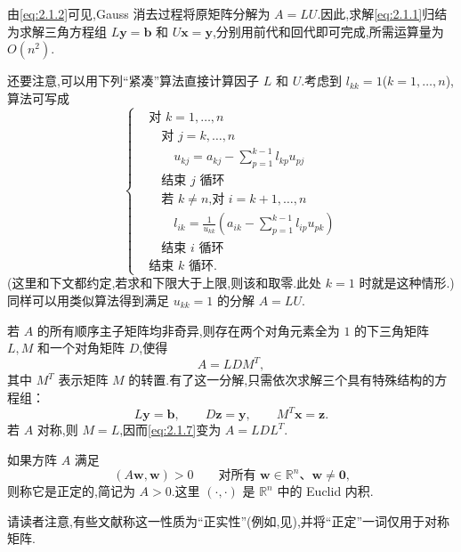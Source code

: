 由\eqref{eq:2.1.2}可见,Gauss 消去过程将原矩阵分解为 \(A=LU\).因此,求解\eqref{eq:2.1.1}归结为求解三角方程组 \(L\boldsymbol{y}=\boldsymbol{b}\) 和 \(U\boldsymbol{x}=\boldsymbol{y}\),分别用前代和回代即可完成,所需运算量为 \(O(n^2)\).

还要注意,可以用下列“紧凑”算法直接计算因子 \(L\) 和 \(U\).考虑到 \(l_{kk}=1\)(\(k=1,\ldots,n\)),算法可写成
\begin{equation}\label{eq:2.1.6}
  \left\{
  \begin{aligned}
    &\text{对 }k=1,\ldots,n\\
    &\quad\text{对 }j=k,\ldots,n\\
    &\qquad u_{kj}=a_{kj}-\sum_{p=1}^{k-1} l_{kp}u_{pj}\\
    &\quad\text{结束 \(j\) 循环}\\
    &\quad\text{若 \(k\ne n\),对 }i=k+1,\ldots,n\\
    &\qquad l_{ik}=\frac1{u_{kk}}\left(a_{ik}-\sum_{p=1}^{k-1} l_{ip}u_{pk}\right)\\
    &\quad\text{结束 \(i\) 循环}\\
    &\text{结束 \(k\) 循环.}
  \end{aligned}
  \right.
\end{equation}
(这里和下文都约定,若求和下限大于上限,则该和取零.此处 \(k=1\) 时就是这种情形.)同样可以用类似算法得到满足 \(u_{kk}=1\) 的分解 \(A=LU\).

若 \(A\) 的所有顺序主子矩阵均非奇异,则存在两个对角元素全为 \(1\) 的下三角矩阵 \(L,M\) 和一个对角矩阵 \(D\),使得
\begin{equation}\label{eq:2.1.7}
  A=LDM^T,
\end{equation}
其中 \(M^T\) 表示矩阵 \(M\) 的转置.有了这一分解,只需依次求解三个具有特殊结构的方程组：
\[
  L\boldsymbol{y}=\boldsymbol{b},\qquad D\boldsymbol{z}=\boldsymbol{y},\qquad M^T\boldsymbol{x}=\boldsymbol{z}.
\]
若 \(A\) 对称,则 \(M=L\),因而\eqref{eq:2.1.7}变为 \(A=LDL^T\).

\begin{definition*}[正定矩阵]
如果方阵 \(A\) 满足
\begin{equation}\label{eq:2.1.8}
  (A\boldsymbol{w},\boldsymbol{w})>0\qquad
  \text{对所有 \(\boldsymbol{w}\in\mathbb R^n\)、\(\boldsymbol{w}\ne\boldsymbol{0}\),}
\end{equation}
则称它是{\heiti 正定的},简记为 \(A>0\).这里 \((\cdot,\cdot)\) 是 \(\mathbb R^n\) 中的 Euclid 内积.
\end{definition*}
请读者注意,有些文献称这一性质为“正实性”(例如,见),并将“正定”一词仅用于对称矩阵.

